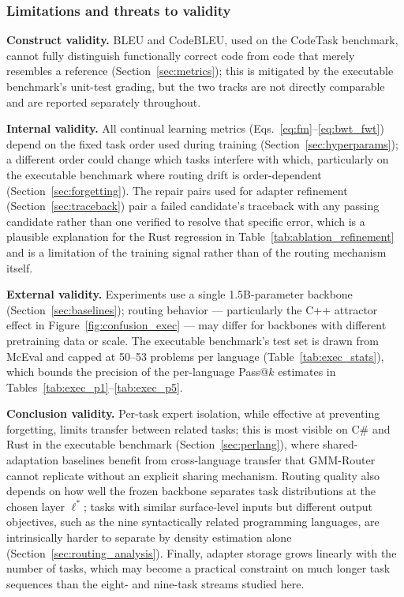 \subsubsection{Limitations and threats to validity}
\label{sec:limitations}

\textbf{Construct validity.} BLEU and CodeBLEU, used on the CodeTask benchmark, cannot fully distinguish functionally correct code from code that merely resembles a reference (Section~\ref{sec:metrics}); this is mitigated by the executable benchmark's unit-test grading, but the two tracks are not directly comparable and are reported separately throughout.

\textbf{Internal validity.} All continual learning metrics (Eqs.~\eqref{eq:fm}--\eqref{eq:bwt_fwt}) depend on the fixed task order used during training (Section~\ref{sec:hyperparams}); a different order could change which tasks interfere with which, particularly on the executable benchmark where routing drift is order-dependent (Section~\ref{sec:forgetting}). The repair pairs used for adapter refinement (Section~\ref{sec:traceback}) pair a failed candidate's traceback with any passing candidate rather than one verified to resolve that specific error, which is a plausible explanation for the Rust regression in Table~\ref{tab:ablation_refinement} and is a limitation of the training signal rather than of the routing mechanism itself.

\textbf{External validity.} Experiments use a single 1.5B-parameter backbone (Section~\ref{sec:baselines}); routing behavior --- particularly the C++ attractor effect in Figure~\ref{fig:confusion_exec} --- may differ for backbones with different pretraining data or scale. The executable benchmark's test set is drawn from McEval and capped at 50--53 problems per language (Table~\ref{tab:exec_stats}), which bounds the precision of the per-language Pass@$k$ estimates in Tables~\ref{tab:exec_p1}--\ref{tab:exec_p5}.

\textbf{Conclusion validity.} Per-task expert isolation, while effective at preventing forgetting, limits transfer between related tasks; this is most visible on C\# and Rust in the executable benchmark (Section~\ref{sec:perlang}), where shared-adaptation baselines benefit from cross-language transfer that GMM-Router cannot replicate without an explicit sharing mechanism. Routing quality also depends on how well the frozen backbone separates task distributions at the chosen layer $\ell^*$; tasks with similar surface-level inputs but different output objectives, such as the nine syntactically related programming languages, are intrinsically harder to separate by density estimation alone (Section~\ref{sec:routing_analysis}). Finally, adapter storage grows linearly with the number of tasks, which may become a practical constraint on much longer task sequences than the eight- and nine-task streams studied here.
